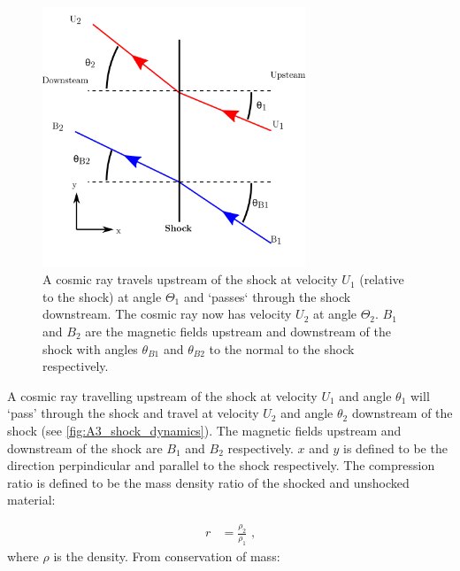 \begin{figure}
	\centering
	\includegraphics[width=0.7\textwidth]{A3_Diffusive_Shock_Acceleration/Images/shock_dynamics.png}
	\caption{A cosmic ray travels upstream of the shock at velocity $U_1$ (relative to the shock) at angle $\Theta_1$ and `passes` through the shock downstream. The cosmic ray now has velocity $U_2$ at angle $\Theta_2$. $B_1$ and $B_2$ are the magnetic fields upstream and downstream of the shock with angles $\theta_{B1}$ and $\theta_{B2}$ to the normal to the shock respectively.}
	\label{fig:A3_shock_dynamics}
\end{figure}

A cosmic ray travelling upstream of the shock at velocity $U_1$ and angle $\theta_1$ will `pass' through the shock and travel at velocity $U_2$ and angle $\theta_2$ downstream of the shock (see \autoref{fig:A3_shock_dynamics}). The magnetic fields upstream and downstream of the shock are $B_1$ and $B_2$ respectively.  $x$ and $y$ is defined to be the direction perpindicular and parallel to the shock respectively.
The compression ratio is defined to be the mass density ratio of the shocked and unshocked material:

\begin{equation}
    \begin{aligned}
        r&=\frac{\rho_2}{\rho_1}\text{ ,}
    \end{aligned}
\end{equation}
\noindent where $\rho$ is the density. From conservation of mass:

